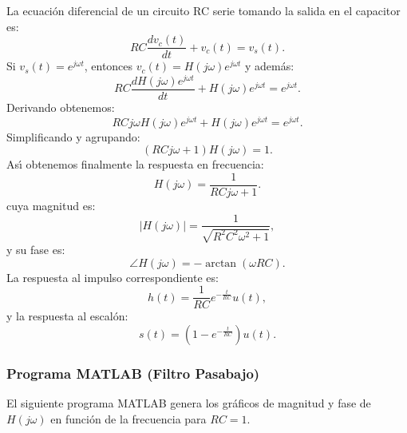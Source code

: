 \documentclass[11pt,a4paper,openany]{book}
\begin{document}
La ecuación diferencial de un circuito RC serie tomando la salida en el capacitor es:
\begin{equation}
	RC\frac{dv_{c}(t)}{dt} + v_{c}(t) = v_{s}(t).
\end{equation}
Si $v_{s}(t) = e^{j\omega t}$, entonces $v_{c}(t) = H(j\omega) e^{j\omega t}$ y adem\'{a}s:
\begin{equation}
	RC\frac{dH(j\omega) e^{j\omega t}}{dt} + H(j\omega) e^{j\omega t} = e^{j\omega t}.
\end{equation}
Derivando obtenemos:
\begin{equation}
	RC j\omega H(j\omega) e^{j\omega t} + H(j\omega) e^{j\omega t} = e^{j\omega t}.
\end{equation}
Simplificando y agrupando:
\begin{equation}
	(RC j\omega + 1) H(j\omega) = 1.
\end{equation}
As\'{\i} obtenemos finalmente la respuesta en frecuencia:
\begin{equation}
	H(j\omega) = \frac{1}{R C j\omega + 1}.
\end{equation}
cuya magnitud es:
\begin{equation}
	|H(j\omega)| = \frac{1}{\sqrt{R^{2} C^{2} \omega^{2} + 1}},
\end{equation}
y su fase es:
\begin{equation}
	\angle H(j\omega) = -\arctan(\omega R C).
\end{equation}
La respuesta al impulso correspondiente es:
\begin{equation}
	h(t) = \frac{1}{RC} e^{-\frac{t}{RC}} u(t),
\end{equation}
y la respuesta al escalón:
\begin{equation}
	s(t) = \left( 1 - e^{-\frac{t}{RC}} \right) u(t).
\end{equation}

\subsubsection{Programa MATLAB (Filtro Pasabajo)}

El siguiente programa MATLAB genera los gr\'{a}ficos de magnitud y fase de $H(j\omega)$ en funci\'{o}n de la frecuencia para $RC=1$.
\end{document}
